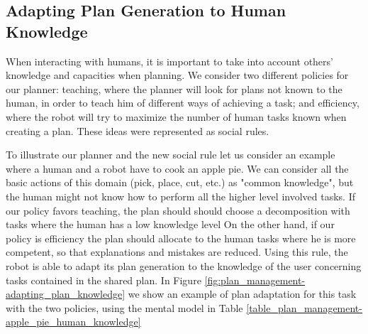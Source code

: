 

\subsection{Adapting Plan Generation to Human Knowledge}
\label{subsec-plan_generation-adapting_knowledge}
When interacting with humans, it is important to take into account others' knowledge and capacities when planning. We consider two different policies for our planner: teaching, where the planner will look for plans not known to the human, in order to teach him of different ways of achieving a task; and efficiency, where the robot will try to maximize the number of human tasks known when creating a plan. These ideas were represented as social rules.

To illustrate our planner and the new social rule let us consider an example where a human and a robot have to cook an apple pie. We can consider all the basic actions of this domain (pick, place, cut, etc.) as "common knowledge", but the human might not know how to perform all the higher level involved tasks. If our policy favors teaching, 
the plan should should choose a decomposition with tasks where the human has a low knowledge level  On the other hand, if our policy is efficiency the plan should allocate to the human tasks where he is more competent, so that explanations and mistakes are reduced. Using this rule, the robot is able to adapt its plan generation to the knowledge of the user concerning tasks contained in the shared plan. In Figure \ref{fig:plan_management-adapting_plan_knowledge} we show an example of plan adaptation for this task with the two policies, using the mental model in Table \ref{table_plan_management-apple_pie_human_knowledge}

